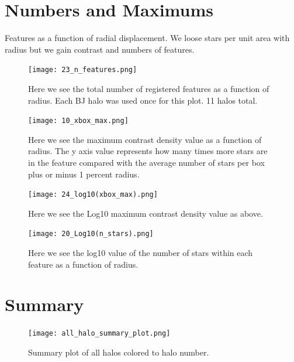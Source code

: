 \documentclass[11pt,a4paper,fleqn,notitlepage,oneside]{article}
\begin{document}

\section{Numbers and Maximums} %
	\label{sec:numbers}
	Features as a function of radial displacement.
	We loose stars per unit area with radius but we gain contrast and numbers of features.

	\begin{figure}[H]
		\texttt{[image: 23\_n\_features.png]}
		\caption{
			Here we see the total number of registered features as a function of radius.
			Each BJ halo was used once for this plot.
			11 halos total.
		}
		\label{fig:n_features}
	\end{figure}
	\begin{figure}[H]
		\texttt{[image: 10\_xbox\_max.png]}
		\caption{
			Here we see the maximum contrast density value as a function of radius.
			The y axis value represents how many times more stars are in the feature compared with the average number of stars per box plus or minus 1 percent radius. 
		}
		\label{fig:xbox_max}
	\end{figure}

	\begin{figure}[H]
		\texttt{[image: 24\_log10(xbox\_max).png]}
		\caption{
			Here we see the Log10 maximum contrast density value as above. 
		}
		\label{fig:24_log10(xbox_max)}
	\end{figure}

	\begin{figure}[H]
		\texttt{[image: 20\_Log10(n\_stars).png]}
		\caption{
			Here we see the log10 value of the number of stars within each feature as a function of radius. 
		}
		\label{fig:n_stars}
	\end{figure}



\section{Summary} %
	\label{sec:summary}


	\begin{figure}[H]
		\texttt{[image: all\_halo\_summary\_plot.png]}
		\caption{
			Summary plot of all halos colored to halo number. 
		}
		\label{fig:all halos - summary plot}
	\end{figure}

\end{document}
